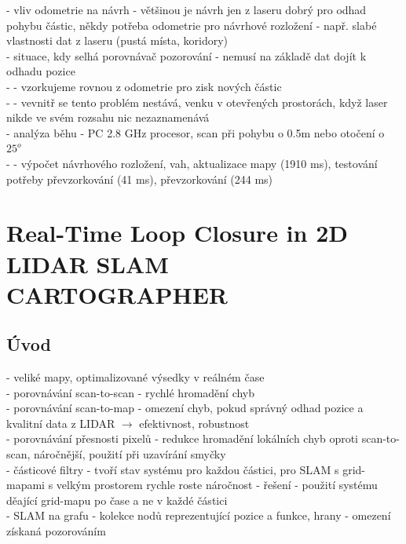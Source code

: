 \documentclass[11pt]{article}
\begin{document}
 - vliv odometrie na návrh - většinou je návrh jen z laseru dobrý pro odhad pohybu částic, někdy potřeba odometrie pro návrhové rozložení - např. slabé vlastnosti dat z laseru (pustá místa, koridory)\\
 - situace, kdy selhá porovnávač pozorování - nemusí na základě dat dojít k odhadu pozice\\
 - - vzorkujeme rovnou z odometrie pro zisk nových částic\\
 - - vevnitř se tento problém nestává, venku v otevřených prostorách, když laser nikde ve svém rozsahu nic nezaznamenává\\
 - analýza běhu - PC 2.8 GHz procesor, scan při pohybu o 0.5m nebo otočení o $25^o$\\
 - - výpočet návrhového rozložení, vah, aktualizace mapy (1910 ms), testování potřeby převzorkování (41 ms), převzorkování (244 ms)\\



\section{Real-Time Loop Closure in 2D LIDAR SLAM \\ CARTOGRAPHER}

\subsection{Úvod}
- veliké mapy, optimalizované výsedky v reálném čase\\
- porovnávání scan-to-scan - rychlé hromadění chyb\\
- porovnávání scan-to-map -  omezení chyb, pokud správný odhad pozice a kvalitní data z LIDAR $\rightarrow$ efektivnost, robustnost\\
- porovnávání přesnosti pixelů - redukce hromadění lokálních chyb oproti scan-to-scan, náročnější, použití při uzavírání smyčky\\
- částicové filtry - tvoří stav systému pro každou částici, pro SLAM s grid-mapami s velkým prostorem rychle roste náročnost - řešení - použití systému děající grid-mapu po čase a ne v každé částici\\
- SLAM na grafu - kolekce nodů reprezentující pozice a funkce, hrany - omezení získaná pozorováním\\
\end{document}
